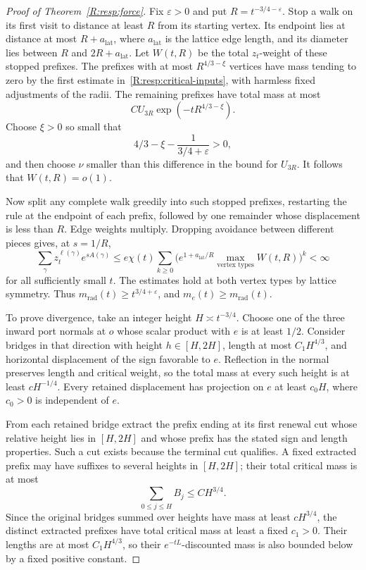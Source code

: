 \begin{proof}[Proof of Theorem~\ref{R:resp:force}]
Fix $\varepsilon>0$ and put $R=t^{-3/4-\varepsilon}$. Stop a walk on its first visit to distance at least $R$ from its starting vertex. Its endpoint lies at distance at most $R+a_{\mathrm{lat}}$, where $a_{\mathrm{lat}}$ is the lattice edge length, and its diameter lies between $R$ and $2R+a_{\mathrm{lat}}$. Let $W(t,R)$ be the total $z_t$-weight of these stopped prefixes. The prefixes with at most $R^{4/3-\xi}$ vertices have mass tending to zero by the first estimate in~\eqref{R:resp:critical-inputs}, with harmless fixed adjustments of the radii. The remaining prefixes have total mass at most
\[
 C U_{3R}\exp(-tR^{4/3-\xi}).
\]
Choose $\xi>0$ so small that
\[
 4/3-\xi-\frac1{3/4+\varepsilon}>0,
\]
and then choose $\nu$ smaller than this difference in the bound for $U_{3R}$. It follows that $W(t,R)=o(1)$.

Now split any complete walk greedily into such stopped prefixes, restarting the rule at the endpoint of each prefix, followed by one remainder whose displacement is less than $R$. Edge weights multiply. Dropping avoidance between different pieces gives, at $s=1/R$,
\[
 \sum_\gamma z_t^{\ell(\gamma)}e^{sA(\gamma)}
 \le e\chi(t)\sum_{k\ge0}
       \bigl(e^{1+a_{\mathrm{lat}}/R}\max_{\text{vertex types}}W(t,R)\bigr)^k<\infty
\]
for all sufficiently small $t$. The estimates hold at both vertex types by lattice symmetry. Thus $m_{\mathrm{rad}}(t)\ge t^{3/4+\varepsilon}$, and $m_e(t)\ge m_{\mathrm{rad}}(t)$.

To prove divergence, take an integer height $H\asymp t^{-3/4}$. Choose one of the three inward port normals at $o$ whose scalar product with $e$ is at least $1/2$. Consider bridges in that direction with height $h\in[H,2H]$, length at most $C_1H^{4/3}$, and horizontal displacement of the sign favorable to $e$. Reflection in the normal preserves length and critical weight, so the total mass at every such height is at least $cH^{-1/4}$. Every retained displacement has projection on $e$ at least $c_0H$, where $c_0>0$ is independent of $e$.

From each retained bridge extract the prefix ending at its first renewal cut whose relative height lies in $[H,2H]$ and whose prefix has the stated sign and length properties. Such a cut exists because the terminal cut qualifies. A fixed extracted prefix may have suffixes to several heights in $[H,2H]$; their total critical mass is at most
\[
 \sum_{0\le j\le H}B_j\le CH^{3/4}.
\]
Since the original bridges summed over heights have mass at least $cH^{3/4}$, the distinct extracted prefixes have total critical mass at least a fixed $c_1>0$. Their lengths are at most $C_1H^{4/3}$, so their $e^{-tL}$-discounted mass is also bounded below by a fixed positive constant.


\end{proof}
